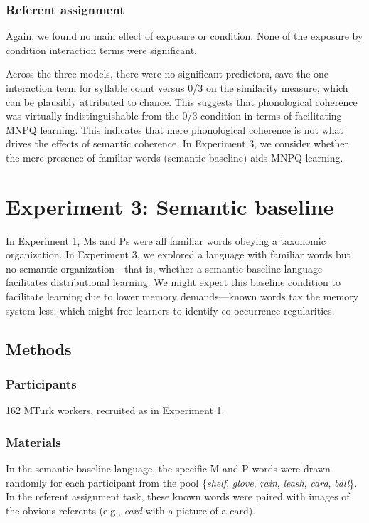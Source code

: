 \documentclass[man,floatsintext]{apa6}
\begin{document}
\subsubsection{Referent assignment}
Again, we found no main effect of exposure or condition. None of the exposure by condition interaction terms were significant.

Across the three models, there were no significant predictors, save the one interaction term for syllable count versus 0/3 on the similarity measure, which can be plausibly attributed to chance. This suggests that phonological coherence was virtually indistinguishable from the 0/3 condition in terms of facilitating MNPQ learning. This indicates that mere phonological coherence is not what drives the effects of semantic coherence. In Experiment 3, we consider whether the mere presence of familiar words (semantic baseline) aids MNPQ learning.

\section{Experiment 3: Semantic baseline}

In Experiment 1, Ms and Ps were all familiar words obeying a taxonomic organization. In Experiment 3, we explored a language with familiar words but no semantic organization---that is, whether a semantic baseline language facilitates distributional learning. We might expect this baseline condition to facilitate learning due to lower memory demands---known words tax the memory system less, which might free learners to identify co-occurrence regularities.

\subsection{Methods}
\subsubsection{Participants}
162 MTurk workers, recruited as in Experiment 1.

\subsubsection{Materials}
In the semantic baseline language, the specific M and P words were drawn randomly for each participant from the pool \{\emph{shelf}, \emph{glove}, \emph{rain}, \emph{leash}, \emph{card}, \emph{ball}\}. In the referent assignment task, these known words were paired with images of the obvious referents (e.g., \emph{card} with a picture of a card).
\end{document}
